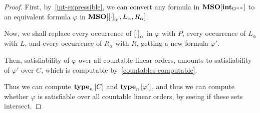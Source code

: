 \begin{proof}
  First, by~\cref{int-expressible}, we can convert
  any formula in $\mathbf{MSO}[\mathbf{int}_{\Omega^{< \alpha}}]$
  to an equivalent formula $\varphi$ in $\mathbf{MSO}[\left[ {\cdot} \right]_{\alpha}, L_{\alpha}, R_{\alpha}]$.

  Now, we shall replace every occurrence of $\left[ {\cdot} \right]_{\alpha}$ in $\varphi$ with $P$,
  every occurrence of $L_{\alpha}$ with $L$,
  and every occurrence of $R_{\alpha}$ with $R$,
  getting a new formula $\varphi'$.

  Then, satisfiability of $\varphi$ over all countable linear orders,
  amounts to satisfiability of $\varphi'$ over $C$,
  which is computable by~\cref{countables-computable}.

  Thus we can compute $\mathbf{type}_{n} \left[ {C} \right]$ and $\mathbf{type}_{n} \left[ {\varphi'} \right]$,
  and thus we can compute whether $\varphi$ is satisfiable over all countable linear orders,
  by seeing if these sets intersect.
\end{proof}
